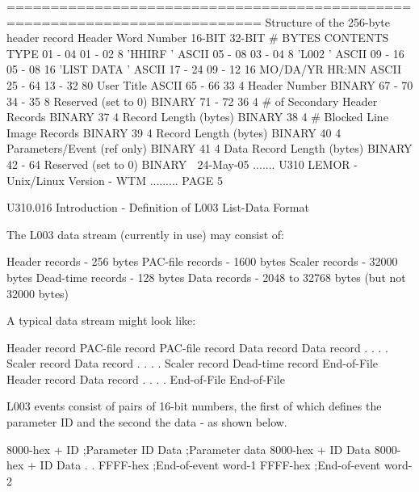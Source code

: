    ===========================================================================
   Structure of the 256-byte header record
   Header Word Number
      16-BIT   32-BIT   # BYTES  CONTENTS                        TYPE
     01 - 04  01 - 02         8  'HHIRF   '                      ASCII
     05 - 08  03 - 04         8  'L002    '                      ASCII
     09 - 16  05 - 08        16  'LIST DATA       '              ASCII
     17 - 24  09 - 12        16  MO/DA/YR HR:MN                  ASCII
     25 - 64  13 - 32        80  User Title                      ASCII
     65 - 66       33         4  Header Number                   BINARY
     67 - 70  34 - 35         8  Reserved (set to 0)             BINARY
     71 - 72       36         4  # of Secondary Header Records   BINARY
                   37         4  Record Length (bytes)           BINARY
                   38         4  # Blocked Line Image Records    BINARY
                   39         4  Record Length (bytes)           BINARY
                   40         4  Parameters/Event (ref only)     BINARY
                   41         4  Data Record Length (bytes)      BINARY
              42 - 64            Reserved (set to 0)             BINARY
    
   24-May-05 ....... U310  LEMOR - Unix/Linux Version - WTM ......... PAGE   5
 
 
   U310.016  Introduction - Definition of L003 List-Data Format
 
 
   The L003 data stream (currently in use) may consist of:
 
   Header    records - 256   bytes
   PAC-file  records - 1600  bytes
   Scaler    records - 32000 bytes
   Dead-time records - 128   bytes
   Data      records - 2048 to 32768 bytes (but not 32000 bytes)
 
   A typical data stream might look like:
 
   Header    record
   PAC-file  record
   PAC-file  record
   Data      record
   Data      record
    .          .
    .          .
   Scaler    record
   Data      record
    .          .
    .          .
   Scaler    record
   Dead-time record
   End-of-File
   Header    record
   Data      record
    .          .
    .          .
   End-of-File
   End-of-File
 
 
   L003  events consist of pairs of 16-bit numbers, the first of which defines
   the parameter ID and the second the data - as shown below.
 
   8000-hex + ID     ;Parameter ID
   Data              ;Parameter data
   8000-hex + ID
   Data
   8000-hex + ID
   Data
     .
     .
   FFFF-hex          ;End-of-event word-1
   FFFF-hex          ;End-of-event word-2
 
